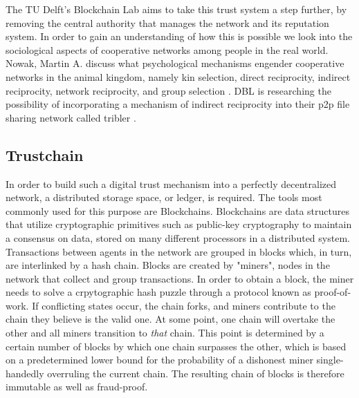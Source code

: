 \documentclass[sigconf]{acmart}
\theoremstyle{definition}
\begin{document}
\noindent The TU Delft's Blockchain Lab aims to take this trust system a step further, by removing the central authority that manages the network and its reputation system. In order to gain an understanding of how this is possible we look into the sociological aspects of cooperative networks among people in the real world. Nowak, Martin A. discuss what psychological mechanisms engender cooperative networks in the animal kingdom, namely kin selection, direct reciprocity, indirect reciprocity, network reciprocity, and group selection \citep{Five Rules for the Evolution of Cooperation}. DBL is researching the possibility of incorporating a mechanism of indirect reciprocity into their p2p file sharing network called tribler \citep{TRIBLER:a social-based peer-to-peer system}.

\subsection{Trustchain}
\label{subsec:Trustchain}
In order to build such a digital trust mechanism into a perfectly decentralized network, a distributed storage space, or ledger, is required. The tools most commonly used for this purpose are Blockchains. Blockchains are data structures that utilize cryptographic primitives such as public-key cryptography to maintain a consensus on data, stored on many different processors in a distributed system. Transactions between agents in the network are grouped in blocks which, in turn, are interlinked by a hash chain. Blocks are created by "miners", nodes in the network that collect and group transactions. In order to obtain a block, the miner needs to solve a crpytographic hash puzzle through a protocol known as proof-of-work. If conflicting states occur, the chain forks, and miners contribute to the chain they believe is the valid one. At some point, one chain will overtake the other and all miners transition to {\it that} chain. This point is determined by a certain number of blocks by which one chain surpasses the other, which is based on a predetermined lower bound for the probability of a dishonest miner single-handedly overruling the current chain. The resulting chain of blocks is therefore immutable as well as fraud-proof\citep{Bitcoin: A peer-to-peer electronic cash system}. \vspace{1em}\\
\end{document}
